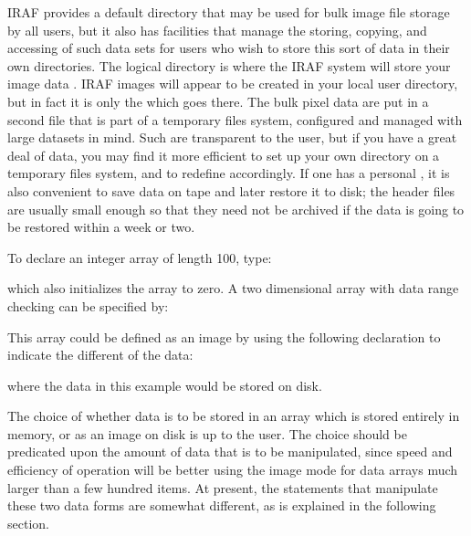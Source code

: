 IRAF provides a default  directory that may be used for
bulk image file storage by all users, but it also has facilities that
manage the storing, copying, and accessing of such data sets for users who
wish to store this sort of data in their own directories.
The logical directory  is where the IRAF system will store
your image data . IRAF images will appear to be created
in your local user directory, but in fact it is only the  which goes there. The bulk pixel data are 
put in a second file that is part of a temporary files
system, configured and managed with large datasets in mind. Such
 are transparent to the user, but if you have a 
great deal of data, you may find it more efficient to set up your own directory
on a temporary files system, and to redefine  accordingly.
If one has a personal , it is also convenient to save data on
tape and later restore it to disk; the header files are usually small
enough so that they need not be archived if the data is going to be restored
within a week or two.

To declare an integer array of length 100, type:

\begin{quotation}\noindent
{} 
\end{quotation}

\noindent
which also initializes the array  to zero.  A two dimensional 
array with data range checking can be specified by:

\begin{quotation}\noindent
{} 
\end{quotation}

\noindent
This array could be defined as an image by using the following declaration
to indicate the different  of the data:

\begin{quotation}\noindent
{} 
\end{quotation}

\noindent
where the data in this example would be stored on disk.

The choice of whether data is to be stored
in an array which is stored entirely in memory,
or as an image on disk is up to the user.
The choice should be predicated upon the
amount of data that is to be manipulated, since speed and efficiency
of operation will be better using the image mode for data arrays
much larger than a few hundred items.  At present, the
statements that manipulate these two data forms are somewhat different,
as is explained in the following section.

